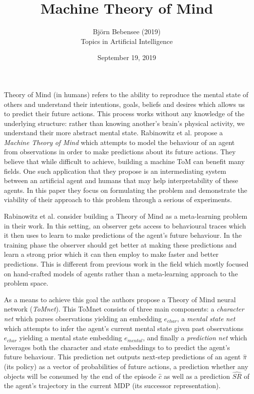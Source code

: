\documentclass[12pt]{article}
\begin{document}
 
 
\title{Machine Theory of Mind}
\author{Bj\"orn Bebensee (2019)\\ %
Topics in Artificial Intelligence}
\date{September 19, 2019}
\maketitle

\noindent
Theory of Mind (in humans) refers to the ability to reproduce the mental state of others and understand their intentions, goals, beliefs and desires which allows us to predict their future actions. This process works without any knowledge of the underlying structure: rather than knowing another's brain's physical activity, we understand their more abstract mental state. Rabinowitz et al. propose a \emph{Machine Theory of Mind} which attempts to model the behaviour of an agent from observations in order to make predictions about its future actions. They believe that while difficult to achieve, building a machine ToM can benefit many fields. One such application that they propose is an intermediating system between an artificial agent and humans that may help interpretability of these agents. In this paper they focus on formulating the problem and demonstrate the viability of their approach to this problem through a serious of experiments.

Rabinowitz et al. consider building a Theory of Mind as a meta-learning problem in their work. In this setting, an observer gets access to behavioural traces which it then uses to learn to make predictions of the agent's future behaviour. In the training phase the observer should get better at making these predictions and learn a strong prior which it can then employ to make faster and better predictions. This is different from previous work in the field which mostly focused on hand-crafted models of agents rather than a meta-learning approach to the problem space.

As a means to achieve this goal the authors propose a Theory of Mind neural network (\emph{ToMnet}). This ToMnet consists of three main components: a \emph{character net} which parses observations yielding an embedding $e_{char}$, a \emph{mental state net} which attempts to infer the agent's current mental state given past observations $e_{char}$ yielding a mental state embedding $e_{mental}$, and finally a \emph{prediction net} which leverages both the character and state embeddings to to predict the agent's future behaviour. This prediction net outputs next-step predictions of an agent $\hat{\pi}$ (its policy) as a vector of probabilities of future actions, a prediction whether any objects will be consumed by the end of the episode $\hat{c}$ as well as a prediction $\hat{SR}$ of the agent's trajectory in the current MDP (its successor representation).
\end{document}
